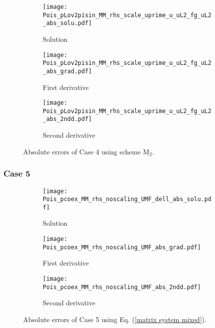\documentclass[final,3p]{elsarticle}
\begin{document}
\begin{figure}[!ht]
    \begin{subfigure}{5.5cm}
        \texttt{[image: Pois\_pLov2pisin\_MM\_rhs\_scale\_uprime\_u\_uL2\_fg\_uL2\_abs\_solu.pdf]}
        \caption{Solution}
        \label{Fig:Pois_pLov2pisin_MM_rhs_scale_uprime_u_uL2_fg_uL2_abs_solu}
    \end{subfigure}
    \begin{subfigure}{5.5cm}
        \texttt{[image: Pois\_pLov2pisin\_MM\_rhs\_scale\_uprime\_u\_uL2\_fg\_uL2\_abs\_grad.pdf]}
        \caption{First derivative}
        \label{Fig:Pois_pLov2pisin_MM_rhs_scale_uprime_u_uL2_fg_uL2_abs_grad}
    \end{subfigure}
    \begin{subfigure}{5.5cm}
        \texttt{[image: Pois\_pLov2pisin\_MM\_rhs\_scale\_uprime\_u\_uL2\_fg\_uL2\_abs\_2ndd.pdf]}
        \caption{Second derivative}
        \label{Fig:Pois_pLov2pisin_MM_rhs_scale_uprime_u_uL2_fg_uL2_abs_2ndd}
    \end{subfigure}
\caption{Absolute errors of Case 4 using scheme $\text{M}_2$.}
\label{Pois_pLov2pisin_MM_rhs_scale_uprime_u_uL2_fg_uL2_abs}
\end{figure}
% 

\subsubsection{Case 5}

\begin{figure}[!ht]
    \begin{subfigure}{5.5cm}
        \texttt{[image: Pois\_pcoex\_MM\_rhs\_noscaling\_UMF\_dell\_abs\_solu.pdf]}
        \caption{Solution}	%
        \label{Fig:Pois_pcoex_MM_rhs_noscaling_UMF_abs_solu}
    \end{subfigure}
    \begin{subfigure}{5.5cm}
        \texttt{[image: Pois\_pcoex\_MM\_rhs\_noscaling\_UMF\_abs\_grad.pdf]}
        \caption{First derivative}
        \label{Fig:Pois_pcoex_MM_rhs_noscaling_UMF_abs_grad}
    \end{subfigure}
    \begin{subfigure}{5.5cm}
        \texttt{[image: Pois\_pcoex\_MM\_rhs\_noscaling\_UMF\_abs\_2ndd.pdf]}
        \caption{Second derivative}
        \label{Fig:Pois_pcoex_MM_rhs_noscaling_UMF_abs_2ndd}
    \end{subfigure}
\caption{Absolute errors of Case 5 using Eq. (\ref{matrix system mixed}).}
\label{Pois_pcoex_MM_rhs_noscaling_UMF_abs}
\end{figure}
\end{document}
